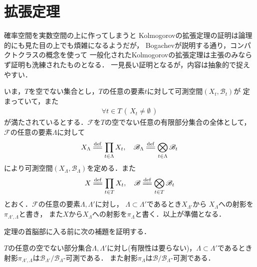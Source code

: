 \section{拡張定理}
	確率空間を実数空間の上に作ってしまうと
	Kolmogorovの拡張定理の証明は論理的にも見た目の上でも煩雑になるようだが，
	Bogachevが説明する通り，コンパクトクラスの概念を使って
	一般化されたKolmogorovの拡張定理は主張のみならず証明も洗練されたものとなる．
	一見長い証明となるが，内容は抽象的で捉えやすい．
	
	いま，$T$を空でない集合とし，$T$の任意の要素$t$に対して可測空間$(X_t,\mathscr{B}_t)$が
	定まっていて，また
	\begin{align}
		\forall t \in T\, (\, X_t \neq \emptyset\, )
	\end{align}
	が満たされているとする．$\mathscr{F}$を$T$の空でない任意の有限部分集合の全体として，$\mathscr{F}$の任意の要素$\Lambda$に対して
	\begin{align}
		X_\Lambda \defeq \prod_{t \in \Lambda} X_t,
		\quad \mathscr{B}_\Lambda \defeq \bigotimes_{t \in \Lambda} \mathscr{B}_t
	\end{align}
	により可測空間$(X_\Lambda,\mathscr{B}_\Lambda)$を定める．また
	\begin{align}
		X \defeq \prod_{t \in T} X_t,
		\quad \mathscr{B} \defeq \bigotimes_{t \in T} \mathscr{B}_t
	\end{align}
	とおく．$\mathscr{F}$の任意の要素$\Lambda,\Lambda'$に対し，
	$\Lambda \subset \Lambda'$であるとき$X_{\Lambda'}$から
	$X_{\Lambda}$への射影を$\pi_{\Lambda',\Lambda}$と書き，
	また$X$から$X_\Lambda$への射影を$\pi_{\Lambda}$と書く．以上が準備となる．
	
	定理の首脳部に入る前に次の補題を証明する．
	\begin{screen}
		\begin{lem}[射影の可測性]\label{lem:Kolmogorov_extension_theorem}
			$T$の任意の空でない部分集合$\Lambda,\Lambda'$に対し(有限性は要らない)，$\Lambda \subset \Lambda'$であるとき
			射影$\pi_{\Lambda',\Lambda}$は$\mathscr{B}_{\Lambda'}/\mathscr{B}_\Lambda$-可測である．
			また射影$\pi_\Lambda$は$\mathscr{B}/\mathscr{B}_\Lambda$-可測である．
		\end{lem}
	\end{screen}
	
